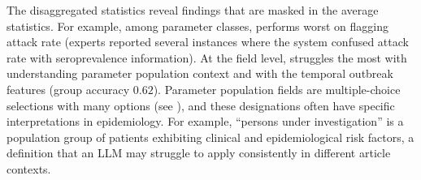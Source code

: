 The disaggregated statistics reveal findings that are masked in the average statistics. For example, among parameter classes, \name{} performs worst on flagging attack rate (experts reported several instances where the system confused attack rate with seroprevalence information). At the field level, \name{} struggles the most with understanding parameter population context and with the temporal outbreak features (group accuracy $0.62$). Parameter population fields are multiple-choice selections with many options (see ), and these designations often have specific interpretations in epidemiology. For example, ``persons under investigation'' is a population group of patients exhibiting clinical and epidemiological risk factors, a definition that an LLM may struggle to apply consistently in different article contexts.
